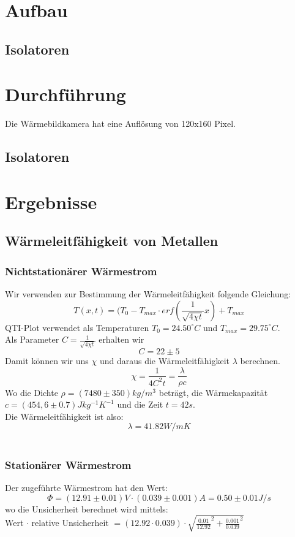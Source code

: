 \documentclass[12pt,a4paper,twopage]{article}
\begin{document}
\section{Aufbau}

\subsection{Isolatoren}
\section{Durchführung}
Die Wärmebildkamera hat eine Auflösung von 120x160 Pixel.
\subsection{Isolatoren}
\section{Ergebnisse}
\subsection{Wärmeleitfähigkeit von Metallen}
\subsubsection{Nichtstationärer Wärmestrom}
Wir verwenden zur Bestimmung der Wärmeleitfähigkeit folgende Gleichung:
$$T(x,t)=(T_0 - T_{max} \cdot erf\left(\frac{1}{\sqrt{4\chi t}}x\right) + T_{max}$$
QTI-Plot verwendet als Temperaturen $T_0=24.50^\circ C$ und $T_{max}=29.75^\circ C$.\\
Als Parameter $C=\frac{1}{\sqrt{4\chi t}}$ erhalten wir
$$C=22 \pm 5$$
Damit können wir uns $\chi$ und daraus die Wärmeleitfähigkeit $\lambda$ berechnen.
$$\chi = \frac{1}{4C^2 t}=\frac{\lambda}{\rho c}$$
Wo die Dichte $\rho = (7480 \pm 350)kg/m^3$ beträgt, die Wärmekapazität $c=(454,6 \pm 0.7)Jkg^{-1}K^{-1}$ und die Zeit $t=42s$.\\
Die Wärmeleitfähigkeit ist also:
$$\boxed{\lambda = 41.82 W/m K}$$
\\
\subsubsection{Stationärer Wärmestrom}
Der zugeführte Wärmestrom hat den Wert:
$$\Phi=(12.91 \pm 0.01)V \cdot (0.039 \pm 0.001)A=0.50 \pm 0.01 J/s$$
wo die Unsicherheit berechnet wird mittels:\\
Wert $\cdot$ relative Unsicherheit $= (12.92 \cdot 0.039) \cdot \sqrt{\frac{0.01}{12.92}^2 + \frac{0.001}{0.039}^2}$\\
\end{document}
